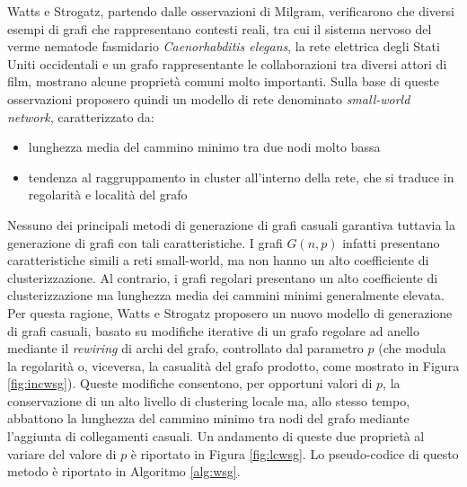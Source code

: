Watts e Strogatz, partendo dalle osservazioni di Milgram, verificarono che diversi esempi di grafi che rappresentano contesti reali, tra cui il sistema nervoso del verme nematode fasmidario \textit{Caenorhabditis elegans}, la rete elettrica degli Stati Uniti occidentali e un grafo rappresentante le collaborazioni tra diversi attori di film, mostrano alcune proprietà comuni molto importanti. Sulla base di queste osservazioni proposero quindi un modello di rete denominato \textit{small-world network}, caratterizzato da:
\begin{itemize}
\item lunghezza media del cammino minimo tra due nodi molto bassa
\item tendenza al raggruppamento in cluster all'interno della rete, che si traduce in regolarità e località del grafo
\end{itemize}

Nessuno dei principali metodi di generazione di grafi casuali garantiva tuttavia la generazione di grafi con tali caratteristiche. I grafi $G(n,p)$ infatti presentano caratteristiche simili a reti small-world, ma non hanno un alto coefficiente di clusterizzazione. Al contrario, i grafi regolari presentano un alto coefficiente di clusterizzazione ma lunghezza media dei cammini minimi generalmente elevata. Per questa ragione, Watts e Strogatz proposero un nuovo modello di generazione di grafi casuali,  basato su modifiche iterative di un grafo regolare ad anello mediante il \textit{rewiring} di archi del grafo, controllato dal parametro $p$ (che modula la regolarità o, viceversa, la casualità del grafo prodotto, come mostrato in Figura \ref{fig:incwsg}). Queste modifiche consentono, per opportuni valori di $p$,  la conservazione di un alto livello di clustering locale ma, allo stesso tempo, abbattono la lunghezza del cammino minimo tra nodi del grafo mediante l'aggiunta di collegamenti casuali.  Un andamento di queste due proprietà al variare del valore di $p$ è riportato in Figura \ref{fig:lcwsg}. Lo pseudo-codice di questo metodo è riportato in Algoritmo \ref{alg:wsg}.

